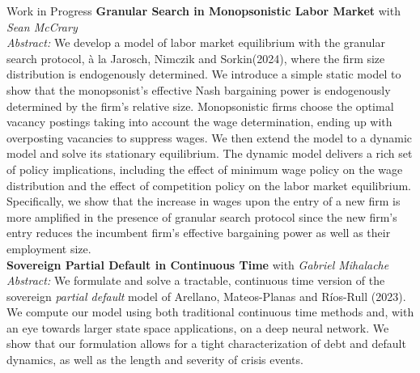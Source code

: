 \documentclass{cv} %
\begin{document}
\begin{rSection}{Work in Progress}
\newpage
\medskip
{\bf Granular Search in Monopsonistic Labor Market} with \emph{Sean McCrary} \\
\begin{adjustbox}{minipage=0.95\textwidth, right}
	\vspace{0.3em} {\emph{Abstract:} We develop a model of labor market equilibrium with the granular search protocol, à la Jarosch, Nimczik and Sorkin(2024), where the firm size distribution is endogenously determined. We introduce a simple static model to show that the monopsonist's effective Nash bargaining power is endogenously determined by the firm's relative size. Monopsonistic firms choose the optimal vacancy postings taking into account the wage determination, ending up with overposting vacancies to suppress wages. We then extend the model to a  dynamic model and solve its stationary equilibrium. The dynamic model delivers a rich set of policy implications, including the effect of minimum wage policy on the wage distribution and the effect of competition policy on the labor market equilibrium. Specifically, we show that the increase in wages upon the entry of a new firm is more amplified in the presence of granular search protocol since the new firm's entry reduces the incumbent firm's effective bargaining power as well as their employment size.}
\end{adjustbox}\\

\medskip
{\bf Sovereign Partial Default in Continuous Time} with \emph{Gabriel Mihalache} \\
	 \begin{adjustbox}{minipage=0.95\textwidth, right}
		\vspace{0.3em} {\emph{Abstract:} We formulate and solve a tractable, continuous time version of the sovereign \emph{partial default} model of Arellano, Mateos-Planas and Ríos-Rull (2023). We compute our model using both traditional continuous time methods and, with an eye towards larger state space applications, on a deep neural network. We show that our formulation allows for a tight characterization of debt and default dynamics, as well as the length and severity of crisis events.}
	\end{adjustbox}\\


\end{rSection}
\end{document}
